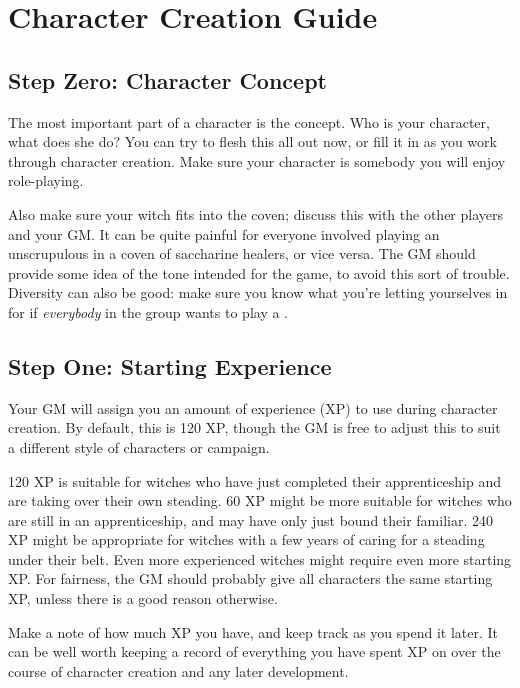 \chapter{Character Creation Guide}

\section{Step Zero: Character Concept}

The most important part of a character is the concept.
Who is your character, what does she do?
You can try to flesh this all out now, or fill it in as you work through character creation.
Make sure your character is somebody you will enjoy role-playing.

Also make sure your witch fits into the coven; discuss this with the other players and your GM.
It can be quite painful for everyone involved playing an unscrupulous  in a coven of saccharine healers, or vice versa.
The GM should provide some idea of the tone intended for the game, to avoid this sort of trouble.
Diversity can also be good: make sure you know what you're letting yourselves in for if \emph{everybody} in the group wants to play a .

\section{Step One: Starting Experience}

Your GM will assign you an amount of experience (XP) to use during character creation.
By default, this is 120 XP, though the GM is free to adjust this to suit a different style of characters or campaign.

120 XP is suitable for witches who have just completed their apprenticeship and are taking over their own steading.
60 XP might be more suitable for witches who are still in an apprenticeship, and may have only just bound their familiar.
240 XP might be appropriate for witches with a few years of caring for a steading under their belt.
Even more experienced witches might require even more starting XP.
For fairness, the GM should probably give all characters the same starting XP, unless there is a good reason otherwise.

Make a note of how much XP you have, and keep track as you spend it later.
It can be well worth keeping a record of everything you have spent XP on over the course of character creation and any later development.

